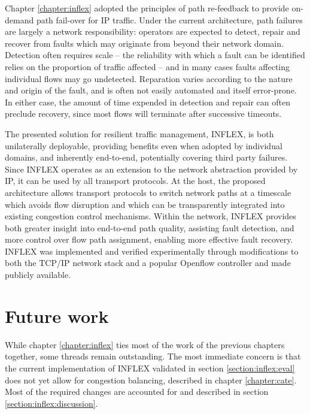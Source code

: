 Chapter \ref{chapter:inflex} adopted the principles of path re-feedback to provide on-demand path fail-over for \ac{IP} traffic.
Under the current architecture, path failures are largely a network responsibility: operators are expected to detect, repair and recover from faults which may originate from beyond their network domain.
Detection often requires scale -- the reliability with which a fault can be identified relies on the proportion of traffic affected -- and in many cases faults affecting individual flows may go undetected.
Reparation varies according to the nature and origin of the fault, and is often not easily automated and itself error-prone.
In either case, the amount of time expended in detection and repair can often preclude recovery, since most flows will terminate after successive timeouts.

The presented solution for resilient traffic management, INFLEX, is both unilaterally deployable, providing benefits even when adopted by individual domains, and inherently end-to-end, potentially covering third party failures.
Since INFLEX operates as an extension to the network abstraction provided by \ac{IP}, it can be used by all transport protocols.
At the host, the proposed architecture allows transport protocols to switch network paths at a timescale which avoids flow disruption and which can be transparently integrated into existing congestion control mechanisms.
Within the network, INFLEX provides both greater insight into end-to-end path quality, assisting fault detection, and more control over flow path assignment, enabling more effective fault recovery. 
INFLEX was implemented and verified experimentally through modifications to both the \ac{TCP}/\ac{IP} network stack and a popular Openflow controller \cite{pox} and made publicly available.


\section{Future work}

While chapter \ref{chapter:inflex} ties most of the work of the previous chapters together, some threads remain outstanding.
The most immediate concern is that the current implementation of INFLEX validated in section \ref{section:inflex:eval} does not yet allow for congestion balancing, described in chapter \ref{chapter:cate}.
Most of the required changes are accounted for and described in section \ref{section:inflex:discussion}.

